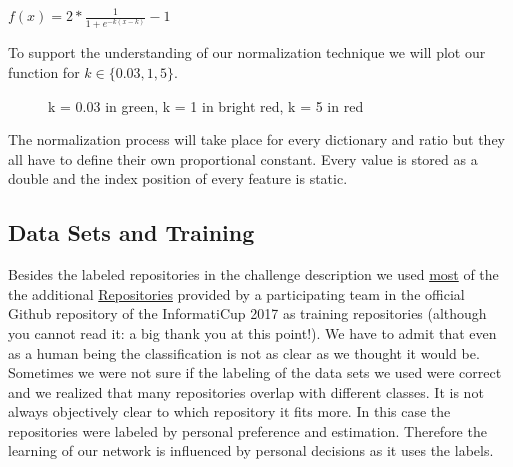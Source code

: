 \documentclass[paper=A4,pagesize=auto,12pt,headinclude=true,footinclude=true,BCOR=0mm,DIV=calc]{scrartcl}
\begin{document}
	$f(x) = 2 * \frac{1}{1 + e^{-k(x-k)}} -1$
	
	To support the understanding of our normalization technique we will plot our function for $k \in \{0.03, 1, 5\}$.\\
	\begin{figure}[H]
		\caption{k = 0.03 in green, k = 1 in bright red, k = 5 in red}
	\end{figure}
	
	The normalization process will take place for every dictionary and ratio but they all have to define their own proportional constant.
	Every value is stored as a double and the index position of every feature is static.
	
	
	
	
	
	\subsection{Data Sets and Training}
	Besides the labeled repositories in the challenge description we used \hyperref[src:TrainingRepositories]{most} of the the additional \hyperref[src:Repositories]{Repositories} provided by a participating team in the official Github repository of the InformatiCup 2017 as training repositories (although you cannot read it: a big thank you at this point!). We have to admit that even as a human being the classification is not as clear as we thought it would be. Sometimes we were not sure if the labeling of the data sets we used were correct and we realized that many repositories overlap with different classes. It is not always objectively clear to which repository it fits more. In this case the repositories were labeled by personal preference and estimation. Therefore the learning of our network is influenced by personal decisions as it uses the labels.
	
\end{document}
